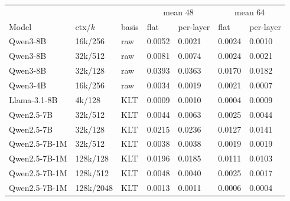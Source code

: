 \begin{tabular}{lllllll}
\toprule
 & & & \multicolumn{2}{c}{mean 48} & \multicolumn{2}{c}{mean 64} \\
Model & ctx/$k$ & basis & flat & per-layer & flat & per-layer \\
\midrule
Qwen3-8B & 16k/256 & raw & 0.0052 & 0.0021 & 0.0024 & 0.0010 \\
Qwen3-8B & 32k/512 & raw & 0.0081 & 0.0074 & 0.0024 & 0.0021 \\
Qwen3-8B & 32k/128 & raw & 0.0393 & 0.0363 & 0.0170 & 0.0182 \\
Qwen3-4B & 16k/256 & raw & 0.0034 & 0.0019 & 0.0021 & 0.0007 \\
Llama-3.1-8B & 4k/128 & KLT & 0.0009 & 0.0010 & 0.0004 & 0.0009 \\
Qwen2.5-7B & 32k/512 & KLT & 0.0044 & 0.0063 & 0.0025 & 0.0044 \\
Qwen2.5-7B & 32k/128 & KLT & 0.0215 & 0.0236 & 0.0127 & 0.0141 \\
Qwen2.5-7B-1M & 32k/512 & KLT & 0.0038 & 0.0038 & 0.0019 & 0.0019 \\
Qwen2.5-7B-1M & 128k/128 & KLT & 0.0196 & 0.0185 & 0.0111 & 0.0103 \\
Qwen2.5-7B-1M & 128k/512 & KLT & 0.0048 & 0.0040 & 0.0025 & 0.0017 \\
Qwen2.5-7B-1M & 128k/2048 & KLT & 0.0013 & 0.0011 & 0.0006 & 0.0004 \\
\bottomrule
\end{tabular}